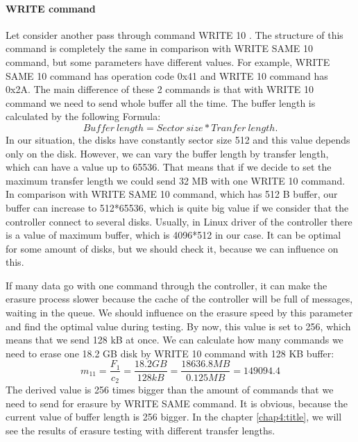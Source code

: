 \paragraph{WRITE command}
Let consider another pass through command WRITE 10 \cite{scsi3_bc}. The structure of this command is completely the same in comparison with WRITE SAME 10 command, but some parameters have different values. For example, WRITE SAME 10 command has operation code 0x41 and WRITE 10 command has 0x2A. The main difference of these 2 commands is that with WRITE 10 command we need to send whole buffer all the time. The buffer length is calculated by the following Formula:
\begin{equation}
	Buffer~length = Sector~size * Tranfer~length.
\end{equation}
In our situation, the disks have constantly sector size 512 and this value depends only on the disk. However, we can vary the buffer length by transfer length, which can have a value up to 65536. That means that if we decide to set the maximum transfer length we could send 32 MB with one WRITE 10 command. In comparison with WRITE SAME 10 command, which has 512 B buffer, our buffer can increase to 512*65536, which is quite big value if we consider that the controller connect to several disks. Usually, in Linux driver of the controller there is a value of maximum buffer, which is 4096*512 in our case. It can be optimal for some amount of disks, but we should check it, because we can influence on this.

If many data go with one command through the controller, it can make the erasure process slower because the cache of the controller will be full of messages, waiting in the queue. We should influence on the erasure speed by this parameter and find the optimal value during testing. By now, this value is set to 256, which means that we send 128 kB at once. We can calculate how many commands we need to erase one 18.2 GB disk by WRITE 10 command with 128 KB buffer:
\begin{equation}
	m_{11}=\frac{F_{1}}{c_{2}}=\frac{18.2GB}{128kB}=\frac{18636.8MB}{0.125MB}=149094.4
\end{equation}
The derived value is 256 times bigger than the amount of commands that we need to send for erasure by WRITE SAME command. It is obvious, because the current value of buffer length is 256 bigger. In the chapter \ref{chap4:title}, we will see the results of erasure testing with different transfer lengths.














